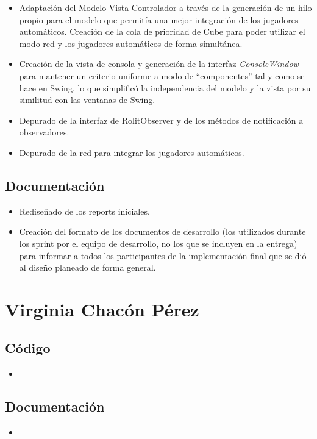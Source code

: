 \documentclass[../FINAL/Scrum/SCRUM.tex]{subfiles}
\begin{document}
\begin{itemize}
\begin{itemize}
\item Adaptación del Modelo-Vista-Controlador a través de la generación de un hilo propio para el modelo que permitía una mejor integración de los jugadores automáticos. Creación de la cola de prioridad de Cube para poder utilizar el modo red y los jugadores automáticos de forma simultánea.

\item Creación de la vista de consola y generación de la interfaz \textit{ConsoleWindow} para mantener un criterio uniforme a modo de ``componentes'' tal y como se hace en Swing, lo que simplificó la independencia del modelo y la vista por su similitud con las ventanas de Swing.

\item Depurado de la interfaz de RolitObserver y de los métodos de notificación a observadores.

\item Depurado de la red para integrar los jugadores automáticos.
\end{itemize}
\subsection*{Documentación}
\begin{itemize}
\item Rediseñado de los reports iniciales.
\item Creación del formato de los documentos de desarrollo (los utilizados durante los sprint por el equipo de desarrollo, no los que se incluyen en la entrega) para informar a todos los participantes de la implementación final que se dió al diseño planeado de forma general.
\end{itemize}

\section{Virginia Chacón Pérez}
\subsection*{Código}
\begin{itemize}
\item 
\end{itemize}
\subsection*{Documentación}
\begin{itemize}
\item 
\end{itemize}



\end{itemize}
\end{document}
